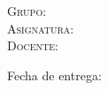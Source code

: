 \begin{titlepage}
\begin{minipage}[c][0.70\textheight][t]{0.8462\textwidth}
\begin{center}
      \vspace{0.5cm}

      {\large\scshape 
        {\color{black}Grupo: \grupo}\\[0.3cm] 
        {Asignatura: \asignatura}\\[.2in]
        {Docente: \docente}}

      \vspace{1cm}
       
      \large{Fecha de entrega: \fechaEntrega}
    \end{center}
  \end{minipage}
\end{titlepage}
